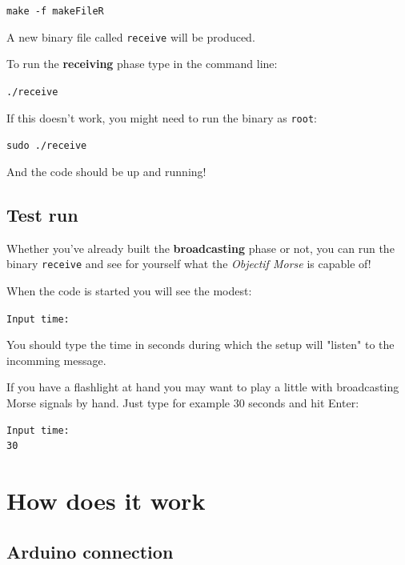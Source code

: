 \documentclass[12pt]{report}
\begin{document}
\begin{snugshade}
\verb|make -f makeFileR|
\end{snugshade}

A new binary file called \verb|receive| will be produced.

To run the \textbf{receiving} phase type in the command line:

\begin{snugshade}
\verb|./receive|
\end{snugshade}

If this doesn't work, you might need to run the binary as \verb|root|:

\begin{snugshade}
\verb|sudo ./receive|
\end{snugshade}

And the code should be up and running!

\subsection{Test run}

Whether you've already built the \textbf{broadcasting} phase or not, you can run the binary \verb|receive| and see for yourself what the \textit{Objectif Morse} is capable of!

When the code is started you will see the modest:

\begin{snugshade}
\verb|Input time:|
\end{snugshade}

You should type the time in seconds during which the setup will "listen" to the incomming message.

If you have a flashlight at hand you may want to play a little with broadcasting Morse signals by hand. Just type for example 30 seconds and hit Enter:

\begin{snugshade}
\begin{verbatim}
Input time:
30
\end{verbatim}
\end{snugshade}


\section{How does it work}

\subsection{Arduino connection}
\end{document}

